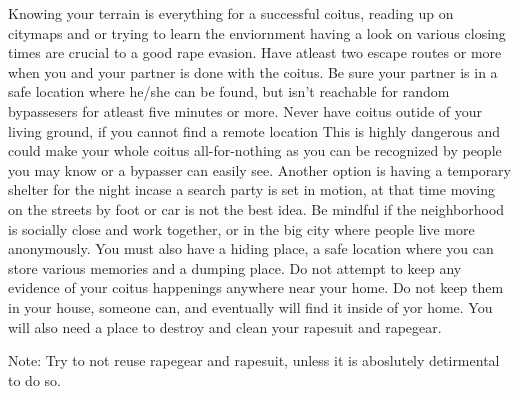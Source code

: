 
Knowing your terrain is everything for a successful coitus, reading up on
citymaps and or trying to learn the enviornment having a look on various closing times are crucial to a
good rape evasion. Have atleast two escape routes or more when you and your
partner is done with the coitus. Be sure your partner is in a safe location
where he/she can be found, but isn't reachable for random bypassesers for atleast
five minutes or more. Never have coitus outide of your living ground, if you cannot find a remote location
This is highly dangerous and could make your whole coitus all-for-nothing
as you can be recognized by people you may know or a bypasser can easily see.
Another option is having a temporary shelter for the night incase a search
party is set in motion, at that time moving on the streets by foot or car is
not the best idea. Be mindful if the neighborhood is socially close and work
together, or in the big city where people live more anonymously. You must also
have a hiding place, a safe location where you can store various memories and a dumping
place. Do not attempt to keep any evidence of your coitus happenings anywhere near your home.
Do not keep them in your house, someone can, and eventually will find it inside of yor home.
You will also need a place to destroy and clean your rapesuit and rapegear.

Note: Try to not reuse rapegear and rapesuit, unless it is aboslutely detirmental to do so.